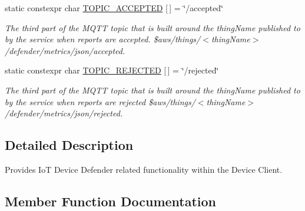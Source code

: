 \begin{DoxyCompactItemize}
\mbox{\label{class_aws_1_1_iot_1_1_device_client_1_1_device_defender_1_1_device_defender_feature_a126efcfab79ced5cf92f19075cc783c8}} 
static constexpr char \hyperlink{class_aws_1_1_iot_1_1_device_client_1_1_device_defender_1_1_device_defender_feature_a126efcfab79ced5cf92f19075cc783c8}{T\+O\+P\+I\+C\+\_\+\+A\+C\+C\+E\+P\+T\+ED} \mbox{[}$\,$\mbox{]} = \char`\"{}/accepted\char`\"{}
\begin{DoxyCompactList}\small\item\em The third part of the M\+Q\+TT topic that is built around the thing\+Name published to by the service when reports are accepted. \$aws/things/$<$thing\+Name$>$/defender/metrics/json/accepted. \end{DoxyCompactList}\item 
\mbox{\label{class_aws_1_1_iot_1_1_device_client_1_1_device_defender_1_1_device_defender_feature_aed0c10562d74c6232c5450a8fa608ea5}} 
static constexpr char \hyperlink{class_aws_1_1_iot_1_1_device_client_1_1_device_defender_1_1_device_defender_feature_aed0c10562d74c6232c5450a8fa608ea5}{T\+O\+P\+I\+C\+\_\+\+R\+E\+J\+E\+C\+T\+ED} \mbox{[}$\,$\mbox{]} = \char`\"{}/rejected\char`\"{}
\begin{DoxyCompactList}\small\item\em The third part of the M\+Q\+TT topic that is built around the thing\+Name published to by the service when reports are rejected \$aws/things/$<$thing\+Name$>$/defender/metrics/json/rejected. \end{DoxyCompactList}\end{DoxyCompactItemize}


\subsection{Detailed Description}
Provides IoT Device Defender related functionality within the Device Client. 

\subsection{Member Function Documentation}
\mbox{\label{class_aws_1_1_iot_1_1_device_client_1_1_device_defender_1_1_device_defender_feature_a5d1c425fb35d74caff528e7b59026211}} 
